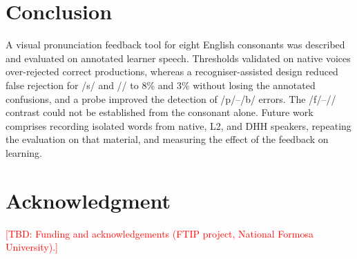 \documentclass[conference]{IEEEtran}
\newcommand{\tbd}[1]{\textcolor{red}{[TBD: #1]}}
\newcommand{\ipa}[1]{/#1/}
\begin{document}
\section{Conclusion}
A visual pronunciation feedback tool for eight English consonants was described and evaluated on annotated learner speech. Thresholds validated on native voices over-rejected correct productions, whereas a recogniser-assisted design reduced false rejection for \ipa{s} and \ipa{\textesh} to 8\% and 3\% without losing the annotated confusions, and a probe improved the detection of \ipa{p}--\ipa{b} errors. The \ipa{f}--\ipa{\texttheta} contrast could not be established from the consonant alone. Future work comprises recording isolated words from native, L2, and DHH speakers, repeating the evaluation on that material, and measuring the effect of the feedback on learning.

\section*{Acknowledgment}
\tbd{Funding and acknowledgements (FTIP project, National Formosa University).}
\end{document}
